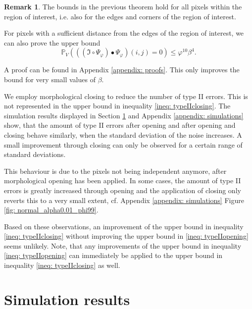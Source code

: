 \documentclass[a4paper,12pt]{article}
\theoremstyle{plain}
\theoremstyle{definition}
\newtheorem{remark}[theorem]{Remark}
\begin{document}
\begin{remark}
	The bounds in the previous theorem hold for all pixels within the region of interest, i.e. also for the edges and corners of the region of interest.
	
	For pixels with a sufficient distance from the edges of the region of interest, we can also prove the upper bound
	\begin{equation*}
		\mathbb{P}_V\left( ((\mathfrak{I} \circ \Psi_\varphi) \bullet \Psi_\varphi)(i, j) = 0 \right) \leq \varphi^{10} \beta^4.
	\end{equation*}
	
	A proof can be found in Appendix \ref{appendix: proofs}. This only improves the bound for very small values of $\beta$.
\end{remark}

We employ morphological closing to reduce the number of type II errors. This is not represented in the upper bound in inequality \eqref{ineq: typeIIclosing}. The simulation results displayed in Section \ref{section: simulationresults} and Appendix \ref{appendix: simulations} show, that the amount of type II errors after opening and after opening and closing behave similarly, when the standard deviation of the noise increases. A small improvement through closing can only be observed for a certain range of standard deviations.

This behaviour is due to the pixels not being independent anymore, after morphological opening has been applied. In some cases, the amount of type II errors is greatly increased through opening and the application of closing only reverts this to a very small extent, cf. Appendix \ref{appendix: simulations} Figure \ref{fig: normal_alpha0.01_phi99}.

Based on these observations, an improvement of the upper bound in inequality \eqref{ineq: typeIIclosing} without improving the upper bound in \eqref{ineq: typeIIopening} seems unlikely.
Note, that any improvements of the upper bound in inequality \eqref{ineq: typeIIopening} can immediately be applied to the upper bound in inequality \eqref{ineq: typeIIclosing} as well.

\newpage



\section{Simulation results}\label{section: simulationresults}
\end{document}
